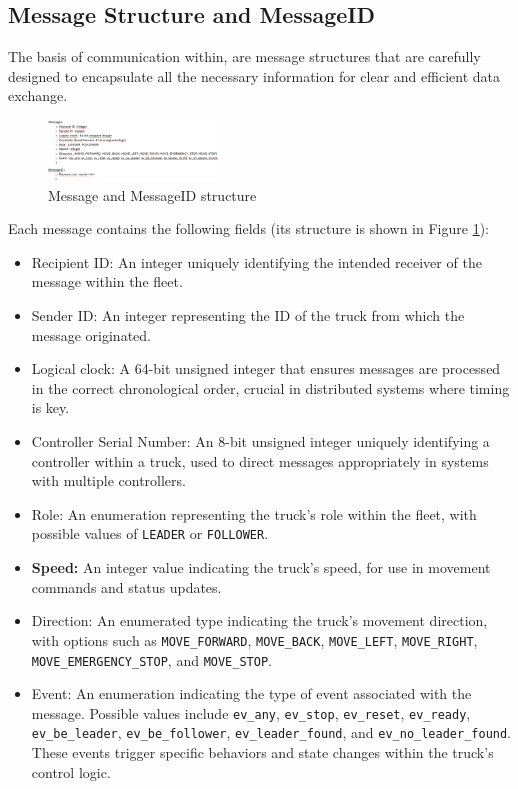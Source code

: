 
\subsection{Message Structure and MessageID}

The basis of communication within, are message structures that are carefully designed to encapsulate all the necessary information for clear and efficient data exchange.

\begin{figure}[ht]
    \centering
    \includegraphics[width=0.4\textwidth]{images/message_messageid_structure.png}
    \caption{Message and MessageID structure}
    \label{img:message_messageid_structure}
\end{figure}

Each message contains the following fields (its structure is shown in Figure \ref{img:message_messageid_structure}):

\begin{itemize}
    \item Recipient ID: An integer uniquely identifying the intended receiver of the message within the fleet.
    \item Sender ID: An integer representing the ID of the truck from which the message originated.
    \item Logical clock: A 64-bit unsigned integer that ensures messages are processed in the correct chronological order, crucial in distributed systems where timing is key.
    \item Controller Serial Number: An 8-bit unsigned integer uniquely identifying a controller within a truck, used to direct messages appropriately in systems with multiple controllers.
    \item Role: An enumeration representing the truck's role within the fleet, with possible values of \texttt{LEADER} or \texttt{FOLLOWER}.
    \item \textbf{Speed:} An integer value indicating the truck's speed, for use in movement commands and status updates.
    \item Direction: An enumerated type indicating the truck's movement direction, with options such as \texttt{MOVE\_FORWARD}, \texttt{MOVE\_BACK}, \texttt{MOVE\_LEFT}, \texttt{MOVE\_RIGHT}, \texttt{MOVE\_EMERGENCY\_STOP}, and \texttt{MOVE\_STOP}.
    \item Event: An enumeration indicating the type of event associated with the message. Possible values include \texttt{ev\_any}, \texttt{ev\_stop}, \texttt{ev\_reset}, \texttt{ev\_ready}, \texttt{ev\_be\_leader}, \texttt{ev\_be\_follower}, \texttt{ev\_leader\_found}, and \texttt{ev\_no\_leader\_found}. These events trigger specific behaviors and state changes within the truck's control logic.
\end{itemize}


